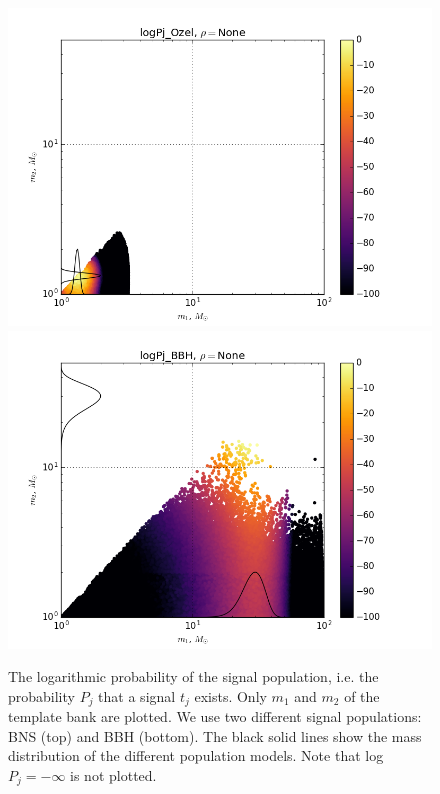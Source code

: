 \documentclass[twocolumn,showpacs,unsortedaddress,superscriptaddress,showkeys,nofootinbib,preprintnumbers,letterpaper]{revtex4-1}
\begin{document}
\begin{figure}
\resizebox{\linewidth}{!}
{\includegraphics{logPj_OzelrhoNone.png}}
\resizebox{\linewidth}{!}
{\includegraphics{logPj_BBHrhoNone.png}}
\caption{The logarithmic probability of the signal population, i.e. the probability $P_j$ that a signal $t_j$ exists. Only $m_1$ and $m_2$ of the template bank are plotted. We use two different signal populations: BNS (top) and BBH (bottom). The black solid lines show the mass distribution of the different population models. Note that log$P_j=-\infty$ is not plotted.}
\label{fig:p_j}
\end{figure}

\end{document}
